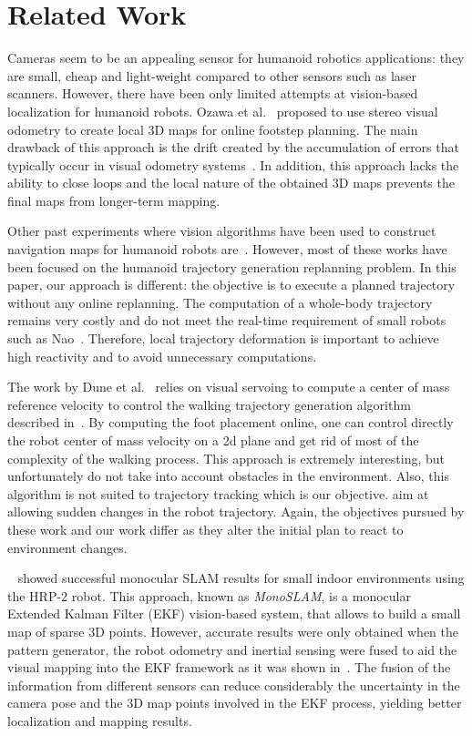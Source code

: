 \section{Related Work}\label{sec:related}

Cameras seem to be an appealing sensor for humanoid robotics
applications: they are small, cheap and light-weight compared to other
sensors such as laser scanners. However, there have been only limited
attempts at vision-based localization for humanoid robots. Ozawa et
al.~\cite{Ozawa05smc} proposed to use stereo visual odometry to create
local 3D maps for online footstep planning. The main drawback of this
approach is the drift created by the accumulation of errors that
typically occur in visual odometry
systems~\cite{Nister04cvpr,Kaess09icra}. In addition, this approach
lacks the ability to close loops and the local nature of the obtained
3D maps prevents the final maps from longer-term mapping.

Other past experiments where vision algorithms have been used to
construct navigation maps for humanoid robots
are~\cite{Michel05humanoids,Michel06icra,Chestnut10book}. However,
most of these works have been focused on the humanoid trajectory
generation replanning problem. In this paper, our approach is
different: the objective is to execute a planned trajectory without
any online replanning. The computation of a whole-body trajectory
remains very costly and do not meet the real-time requirement of small
robots such as Nao~\cite{wikipedia.nao}. Therefore, local trajectory
deformation is important to achieve high reactivity and to avoid
unnecessary computations.

The work by Dune et al.~\cite{Dune10iros} relies on visual servoing to
compute a center of mass reference velocity to control the walking
trajectory generation algorithm described in~\cite{Herdt10adr}. By
computing the foot placement online, one can control directly the
robot center of mass velocity on a 2d plane and get rid of most of the
complexity of the walking process. This approach is extremely
interesting, but unfortunately do not take into account obstacles in
the environment. Also, this algorithm is not suited to trajectory
tracking which is our objective. \cite{Harada04humanoids,
  Morisawa07icra} aim at allowing sudden changes in the robot
trajectory. Again, the objectives pursued by these work and our work
differ as they alter the initial plan to react to environment changes.

~\citet{Davison07pami} showed successful monocular SLAM results for
small indoor environments using the HRP-2 robot. This approach, known
as \textit{MonoSLAM}, is a monocular Extended Kalman Filter (EKF)
vision-based system, that allows to build a small map of sparse 3D
points. However, accurate results were only obtained when the pattern
generator, the robot odometry and inertial sensing were fused to aid
the visual mapping into the EKF framework as it was shown
in~\cite{Stasse06iros}. The fusion of the information from different
sensors can reduce considerably the uncertainty in the camera pose and
the 3D map points involved in the EKF process, yielding better
localization and mapping results.

